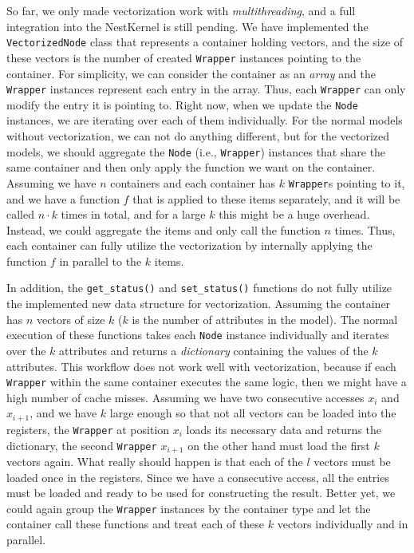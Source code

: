 So far, we only made vectorization work with \emph{multithreading}, and a full integration into the NestKernel is still pending. We have implemented the \texttt{VectorizedNode} class that represents a container holding vectors, and the size of these vectors is the number of created \texttt{Wrapper} instances pointing to the container. For simplicity, we can consider the container as an \emph{array} and the \texttt{Wrapper} instances represent each entry in the array. Thus, each \texttt{Wrapper} can only modify the entry it is pointing to. Right now, when we update the \texttt{Node} instances, we are iterating over each of them individually. For the normal models without vectorization, we can not do anything different, but for the vectorized models, we should aggregate the \texttt{Node} (i.e., \texttt{Wrapper}) instances that share the same container and then only apply the function we want on the container. Assuming we have $n$ containers and each container has $k$ \texttt{Wrapper}s pointing to it, and we have a function $f$ that is applied to these items separately, and it will be called $n\cdot k$ times in total, and for a large $k$ this might be a huge overhead. Instead, we could aggregate the items and only call the function $n$  times. Thus, each container can fully utilize the vectorization by internally applying the function $f$ in parallel to the $k$ items.

In addition, the \texttt{get\_status()} and \texttt{set\_status()} functions do not fully utilize the implemented new data structure for vectorization. Assuming the container has $n$ vectors of size $k$ ($k$ is the number of attributes in the model). The normal execution of these functions takes each \texttt{Node} instance individually and iterates over the $k$ attributes and returns a \emph{dictionary} containing the values of the $k$ attributes. This workflow does not work well with vectorization, because if each \texttt{Wrapper} within the same container executes the same logic, then we might have a high number of cache misses. Assuming we have two consecutive accesses $x_i$ and $x_{i+1}$, and we have $k$ large enough so that not all vectors can be loaded into the registers, the \texttt{Wrapper} at position $x_i$ loads its necessary data and returns the dictionary, the second \texttt{Wrapper} $x_{i+1}$ on the other hand must load the first $k$ vectors again. What really should happen is that each of the $l$ vectors must be loaded once in the registers. Since we have a consecutive access, all the entries must be loaded and ready to be used for constructing the result. Better yet, we could again group the \texttt{Wrapper} instances by the container type and let the container call these functions and treat each of these $k$ vectors individually and in parallel.

\afterpage{\blankpage}
\cleardoublepage

